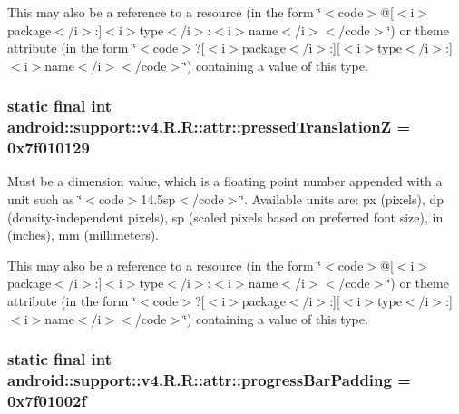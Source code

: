 This may also be a reference to a resource (in the form \char`\"{}$<$code$>$@\mbox{[}$<$i$>$package$<$/i$>$:\mbox{]}$<$i$>$type$<$/i$>$:$<$i$>$name$<$/i$>$$<$/code$>$\char`\"{}) or theme attribute (in the form \char`\"{}$<$code$>$?\mbox{[}$<$i$>$package$<$/i$>$:\mbox{]}\mbox{[}$<$i$>$type$<$/i$>$:\mbox{]}$<$i$>$name$<$/i$>$$<$/code$>$\char`\"{}) containing a value of this type. \hypertarget{classandroid_1_1support_1_1v4_1_1_r_1_1attr_b31bcc17b9bb210a371a05ed5a95312b}{
\subsubsection[{pressedTranslationZ}]{\setlength{\rightskip}{0pt plus 5cm}static final int android::support::v4.R.R::attr::pressedTranslationZ = 0x7f010129}}
\label{classandroid_1_1support_1_1v4_1_1_r_1_1attr_b31bcc17b9bb210a371a05ed5a95312b}


Must be a dimension value, which is a floating point number appended with a unit such as \char`\"{}$<$code$>$14.5sp$<$/code$>$\char`\"{}. Available units are: px (pixels), dp (density-independent pixels), sp (scaled pixels based on preferred font size), in (inches), mm (millimeters). 

This may also be a reference to a resource (in the form \char`\"{}$<$code$>$@\mbox{[}$<$i$>$package$<$/i$>$:\mbox{]}$<$i$>$type$<$/i$>$:$<$i$>$name$<$/i$>$$<$/code$>$\char`\"{}) or theme attribute (in the form \char`\"{}$<$code$>$?\mbox{[}$<$i$>$package$<$/i$>$:\mbox{]}\mbox{[}$<$i$>$type$<$/i$>$:\mbox{]}$<$i$>$name$<$/i$>$$<$/code$>$\char`\"{}) containing a value of this type. \hypertarget{classandroid_1_1support_1_1v4_1_1_r_1_1attr_b6fc90421af832b099f14e36bdd5e7d0}{
\subsubsection[{progressBarPadding}]{\setlength{\rightskip}{0pt plus 5cm}static final int android::support::v4.R.R::attr::progressBarPadding = 0x7f01002f}}
\label{classandroid_1_1support_1_1v4_1_1_r_1_1attr_b6fc90421af832b099f14e36bdd5e7d0}


